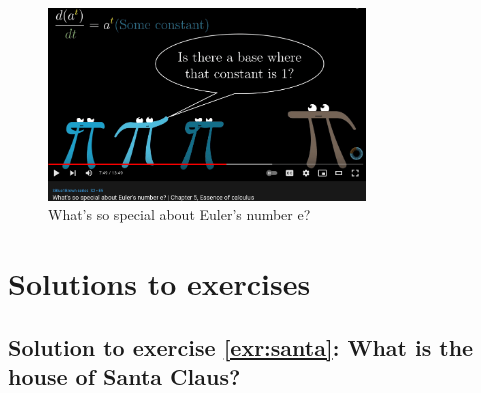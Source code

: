 \documentclass[
  12pt,
  oneside]{book}
\theoremstyle{definition}
\theoremstyle{definition}
\theoremstyle{definition}
\theoremstyle{definition}
\theoremstyle{remark}
\begin{document}
\begin{figure}
\centering
\includegraphics[width=0.75\textwidth,height=\textheight]{fig/euler.png}
\caption{\label{fig:euler} What's so special about Euler's number e?}
\end{figure}

\section{Solutions to exercises}\label{solutions-to-exercises}

\subsection*{Solution to exercise \ref{exr:santa}: What is the house of Santa Claus?}\label{sol:santa}
\end{document}

